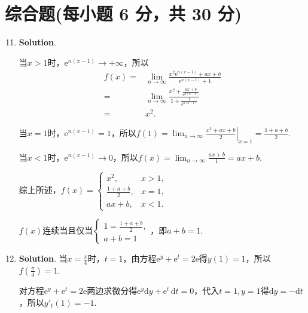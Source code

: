 \documentclass[../Main.tex]{subfiles}
\begin{document}
\section{综合题(每小题 6 分，共 30 分)}
\begin{enumerate}
    \setcounter{enumi}{10}
    \item \textbf{Solution}.

          当$x>1$时，$\mathrm{e}^{n(x-1)}\to+\infty$，所以
          \[
              \begin{aligned}
                  f(x)= & \lim_{n\to\infty}\frac{x^2\mathrm{e}^{n(x-1)}+ax+b}{\mathrm{e}^{n(x-1)}+1}                    \\
                  =     & \lim_{n\to\infty}\frac{x^2+\frac{ax+b}{\mathrm{e}^{n(x-1)}}}{1+\frac{1}{\mathrm{e}^{n(x-1)}}} \\
                  =     & x^{2}.
              \end{aligned}
          \]

          当$x=1$时，$\mathrm{e}^{n(x-1)}=1$，所以$f(1)=\left.\lim_{n\to\infty}\frac{x^{2}+ax+b}{2}
              \right|_{x=1}=\frac{1+a+b}{2}$.

          当$x<1$时，$\mathrm{e}^{n(x-1)}\to0$，所以$f(x)=\lim_{n\to\infty}\frac{ax+b}{1}
              =ax+b$.

          综上所述，$f(x)=
              \begin{cases}
                  x^{2},           & x>1, \\
                  \frac{1+a+b}{2}, & x=1, \\
                  ax+b,            & x<1.
              \end{cases}$

          $f(x)$连续当且仅当$\begin{cases}
                  1=\frac{1+a+b}{2}, \\
                  a+b=1
              \end{cases}$，即$a+b=1$.

    \item \textbf{Solution}. 当$x=\frac{\pi}{4}$时，$t=1$，由方程$\mathrm{e}
              ^{y}+\mathrm{e}^{t}=2\mathrm{e}$得$y(1)=1$，所以$f\left(\frac{\pi}{4}\right
              )=1$.

          对方程$\mathrm{e}^{y}+\mathrm{e}^{t}=2\mathrm{e}$两边求微分得$\mathrm{e}^{y}
              \mathrm{d}y+\mathrm{e}^{t}\,\mathrm{d}t=0$，代入$t=1,y=1$得$\mathrm{d}y=-\mathrm{d}
              t$，所以$y'_{t}(1)=-1$.


\end{enumerate}
\end{document}
